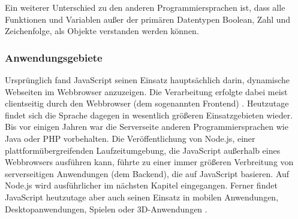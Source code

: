 \noindent
Ein weiterer Unterschied zu den anderen Programmiersprachen ist, dass alle Funktionen und Variablen außer der primären Datentypen Boolean, Zahl und Zeichenfolge, als Objekte verstanden werden können.

\subsubsection{Anwendungsgebiete}
Ursprünglich fand JavaScript seinen Einsatz hauptsächlich darin, dynamische Webseiten im Web\-browser anzuzeigen. Die Verarbeitung erfolgte dabei meist clientseitig durch den Webbrowser (dem sogenannten Frontend) \cite{JS1.3}.
\newline
\noindent
Heutzutage findet sich die Sprache dagegen in wesentlich größeren Einsatzgebieten wieder. 
Bis vor einigen Jahren war die Serverseite anderen Programmiersprachen wie Java oder PHP vorbehalten. Die Veröffentlichung von Node.js, einer plattformübergreifenden Laufzeitumgebung, die JavaScript außerhalb eines Webbrowsers ausführen kann, führte zu einer immer größeren Verbreitung von serverseitigen Anwendungen (dem Backend), die auf JavaScript basieren. Auf Node.js wird ausführlicher im nächsten Kapitel eingegangen. 
Ferner findet JavaScript heutzutage aber auch seinen Einsatz in mobilen Anwendungen, Desktopanwendungen, Spielen oder 3D-Anwendungen \cite{JS1.4}.


